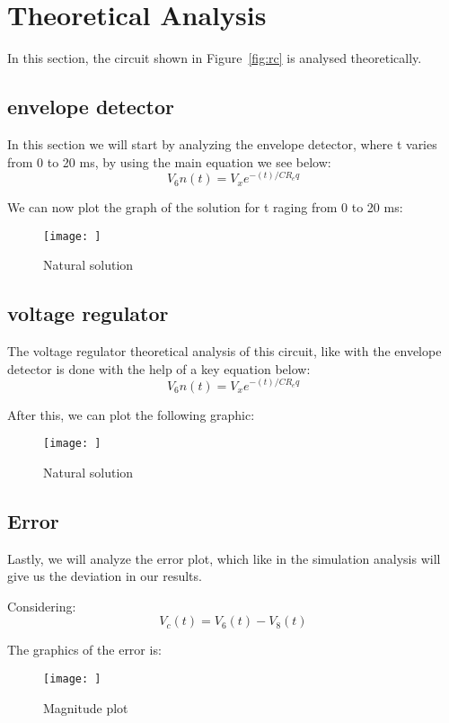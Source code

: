 \section{Theoretical Analysis}
\label{sec:analysis}

In this section, the circuit shown in Figure~\ref{fig:rc} is analysed
theoretically.


\subsection{envelope detector}

In this section we will start by analyzing the envelope detector, where t varies from 0 to 20 ms, by using the main equation we see below:
\begin{equation}
	V_6n(t) = V_xe^{-(t)/CR_eq}
\end{equation}

We can now plot the graph of the solution for t raging from 0 to 20 ms:

\begin{figure}[h!] \centering
\texttt{[image: ]}
\caption{Natural solution}
\label{fig:rc1}
\end{figure}
	
\subsection{voltage regulator}

The voltage regulator theoretical analysis of this circuit, like with the envelope detector is done with the help of a key equation below:
\begin{equation}
	V_6n(t) = V_xe^{-(t)/CR_eq}
\end{equation}

After this, we can plot the following graphic:
\begin{figure}[h!] \centering
	\texttt{[image: ]}
	\caption{Natural solution}
	\label{fig:rc1}
\end{figure}


\subsection{Error}

Lastly, we will analyze the error plot, which like in the simulation analysis will give us the deviation in our results.

Considering:
\begin{equation}
	V_c(t) = V_6(t) - V_8(t)
\end{equation} 



The graphics of the error is:


\begin{figure}[h!] \centering
\texttt{[image: ]}
\caption{Magnitude plot}
\label{fig:rc4}
\end{figure}



